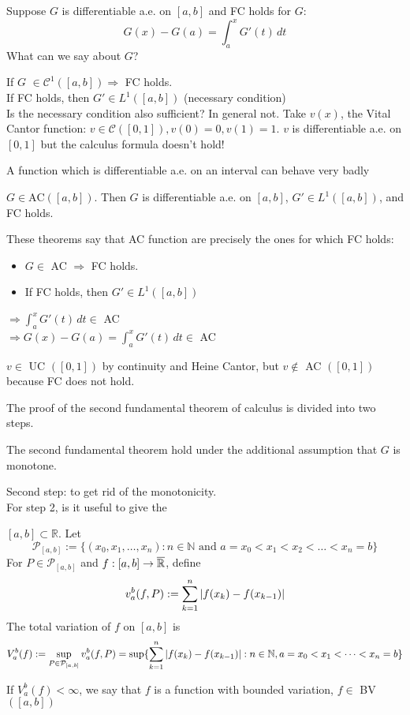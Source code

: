 Suppose \(G\) is differentiable a.e. on \(\left[a, b\right]\) and FC holds for \(G\):
\[
    G(x) - G(a) = \int_a^x G'(t) \, dt
\]
What can we say about \(G\)?
\begin{remark}
    If \(G\) \(\in \mathcal{C}^1(\left[a, b\right]) \Rightarrow\) FC holds. \\
    If FC holds, then \(G' \in L^1(\left[a, b\right]) \) (necessary condition) \\
    Is the necessary condition also sufficient? In general not. 
    Take \(v(x)\), the Vital Cantor function: \(v \in \mathcal{C}([0,1]), v(0)=0, v(1)=1\). \(v\) is differentiable a.e. on \([0,1]\) but the calculus formula doesn't hold!
\end{remark}
\begin{remark}
    A function which is differentiable a.e. on an interval can behave very badly
\end{remark}
\begin{theorem}
    \(G \in \text{AC}([a, b])\). Then \(G\) is differentiable a.e. on \([a, b]\), \(G' \in L^1([a, b])\), and FC holds.
\end{theorem}
\begin{remark}
    These theorems say that AC function are precisely the ones for which FC holds:
    \begin{itemize}
        \item \(G \in \) AC \(\Rightarrow\) FC holds. 
        \item If FC holds, then \(G' \in L^1 ([a, b])\) 
    \end{itemize}
    \(\Rightarrow \int_a^x G'(t) \, dt \in \) AC \\
    \(\Rightarrow G(x) - G(a) = \int_a^x G'(t) \, dt \in \) AC   
\end{remark}
\begin{remark}
    \(v \in \) UC \(([0, 1])\) by continuity and Heine Cantor, but \(v \notin \) AC \(([0, 1])\) because FC does not hold.
\end{remark}

The proof of the second fundamental theorem of calculus is divided into two steps. 
\begin{lemma}
    The second fundamental theorem hold under the additional assumption that \(G\) is monotone.
\end{lemma}
Second step: to get rid of the monotonicity. \\
For step 2, is it useful to give the
\begin{definition}
    \(\left[a, b\right] \subset \mathbb{R}\). Let 
    \[
        \mathcal{P}_{\left[a, b\right]} := \lbrace (x_0, x_1, \dots, x_n): n \in \mathbb{N} \text{ and } a=x_0 < x_1 < x_2 < \dots < x_n = b \rbrace
    \]
    For \(P \in \mathcal{P}_{\left[a, b\right]}\) and \(f: [a, b] \to \overline{\mathbb{R}}\), define
    \[
        v_a^b(f, P) := \sum_{k=1}^n \abs{f(x_k) - f(x_{k-1})}
    \]
    The total variation of \(f \) on \([a, b]\) is 
    \[
        V_a^b (f) := \sup_{P \in \mathcal{P}_{\left[a, b\right]}} v_a^b (f, P)
        = \sup \lbrace \sum_{k=1}^n \abs{f(x_k)-f(x_{k-1})}:n \in \mathbb{N}, a=x_0 < x_1 < \dots <x_n = b \rbrace
    \]
\end{definition}
If \(V_a^b(f) < \infty\), we say that \(f\) is a function with bounded variation, \(f \in \) BV \(([a, b])\)
